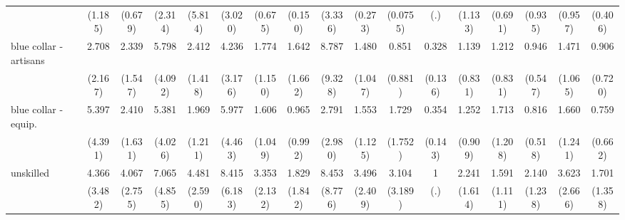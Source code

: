 {\begin{tabular}{l*{16}{c}}
                    &     (1.185)         &     (0.679)         &     (2.314)         &     (5.814)         &     (3.020)         &     (0.675)         &     (0.150)         &     (3.336)         &     (0.273)         &    (0.0755)         &         (.)         &     (1.133)         &     (0.691)         &     (0.935)         &     (0.957)         &     (0.406)         \\
[1em]
blue collar - artisans&       2.708         &       2.339         &       5.798\sym{*}  &       2.412         &       4.236         &       1.774         &       1.642         &       8.787\sym{*}  &       1.480         &       0.851         &       0.328\sym{**} &       1.139         &       1.212         &       0.946         &       1.471         &       0.906         \\
                    &     (2.167)         &     (1.547)         &     (4.092)         &     (1.418)         &     (3.176)         &     (1.150)         &     (1.662)         &     (9.328)         &     (1.047)         &     (0.881)         &     (0.136)         &     (0.831)         &     (0.831)         &     (0.547)         &     (1.065)         &     (0.720)         \\
[1em]
blue collar - equip.&       5.397\sym{*}  &       2.410         &       5.381\sym{*}  &       1.969         &       5.977\sym{*}  &       1.606         &       0.965         &       2.791         &       1.553         &       1.729         &       0.354\sym{**} &       1.252         &       1.713         &       0.816         &       1.660         &       0.759         \\
                    &     (4.391)         &     (1.631)         &     (4.026)         &     (1.211)         &     (4.463)         &     (1.049)         &     (0.992)         &     (2.980)         &     (1.125)         &     (1.752)         &     (0.143)         &     (0.909)         &     (1.208)         &     (0.518)         &     (1.241)         &     (0.662)         \\
[1em]
unskilled           &       4.366         &       4.067\sym{*}  &       7.065\sym{**} &       4.481\sym{**} &       8.415\sym{**} &       3.353         &       1.829         &       8.453\sym{*}  &       3.496         &       3.104         &           1         &       2.241         &       1.591         &       2.140         &       3.623         &       1.701         \\
                    &     (3.482)         &     (2.755)         &     (4.855)         &     (2.590)         &     (6.183)         &     (2.132)         &     (1.842)         &     (8.776)         &     (2.409)         &     (3.189)         &         (.)         &     (1.614)         &     (1.111)         &     (1.238)         &     (2.666)         &     (1.358)         \\

\end{tabular}}
